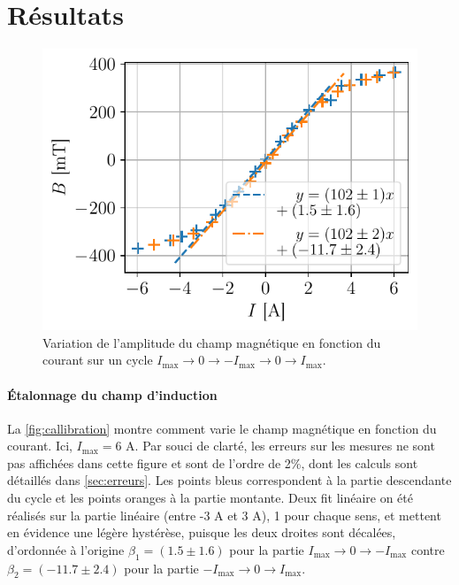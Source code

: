 \section{Résultats}

\begin{minipage}{\textwidth}
    \begin{figure}
        \includegraphics[width=\linewidth]{figures/calibration.pdf}
        \caption{Variation de l'amplitude du champ magnétique en fonction du courant sur un cycle \(I_\textrm{max} \rightarrow 0 \rightarrow -I_\textrm{max} \rightarrow 0 \rightarrow I_\textrm{max}\).}
        \label{fig:callibration}
    \end{figure}

    \paragraph*{Étalonnage du champ d'induction}
    La \autoref{fig:callibration} montre comment varie le champ magnétique en fonction du courant. Ici, \(I_\textrm{max} = 6\) \si{\ampere}. Par souci de clarté, les erreurs sur les mesures ne sont pas affichées dans cette figure et sont de l'ordre de 2\%, dont les calculs sont détaillés dans \autoref{sec:erreurs}. Les points bleus correspondent à la partie descendante du cycle et les points oranges à la partie montante. Deux fit linéaire on été réalisés sur la partie linéaire (entre -3 \si{\ampere} et 3 \si{\ampere}), 1 pour chaque sens, et mettent en évidence une légère hystérèse, puisque les deux droites sont décalées, d'ordonnée à l'origine \(\beta_1 = (1.5 \pm 1.6)\) pour la partie \(I_\textrm{max} \rightarrow 0 \rightarrow -I_\textrm{max}\) contre \(\beta_2 = (-11.7 \pm 2.4)\) pour la partie \(-I_\textrm{max} \rightarrow 0 \rightarrow I_\textrm{max}\).


\end{minipage}
